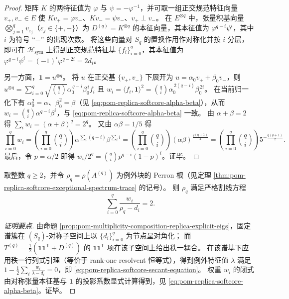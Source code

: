 \begin{proof}
矩阵 \(K\) 的两特征值为 \(\varphi\) 与 \(\psi=-\varphi^{-1}\)，并可取一组正交规范特征向量 \(v_+,v_-\in E\) 使
\(
Kv_+=\varphi v_+
\)、\(
Kv_-=\psi v_-
\)、\(
v_+\perp v_-
\)。
在 \(E^{\otimes q}\) 中，张量积基向量 \(\bigotimes_{j=1}^q v_{\varepsilon_j}\)（\(\varepsilon_j\in\{+,-\}\)）为 \(D^{(q)}=K^{\otimes q}\) 的本征向量，其本征值为 \(\varphi^{q-i}\psi^i\)，其中 \(i\) 为符号 “\(-\)” 的出现次数。
将这些向量对 \(S_q\) 的置换作用作对称化并按 \(i\) 分层，即可在 \(\mathcal H_{\mathrm{sym}}\) 上得到正交规范特征基 \(\{f_i\}_{i=0}^{q}\)，其本征值为 \(\varphi^{q-i}\psi^i=(-1)^i\varphi^{q-2i}=2d_i\)。
\par
另一方面，\(\mathbf{1}=u^{\otimes q}\)。
将 \(u\) 在正交基 \(\{v_+,v_-\}\) 下展开为 \(u=\alpha_0 v_+ +\beta_0 v_-\)，则
\(
u^{\otimes q}
=\sum_{i=0}^q \sqrt{\binom{q}{i}}\alpha_0^{\,q-i}\beta_0^{\,i} f_i
\)
且
\(
w_i=\langle f_i,\mathbf{1}\rangle^2=\binom{q}{i}\alpha_0^{\,2(q-i)}\beta_0^{\,2i}
\)。
在当前归一化下有
\(
\alpha_0^{2}=\alpha
\)、\(
\beta_0^{2}=\beta
\)（见 \eqref{eq:pom-replica-softcore-alpha-beta}），从而 \(w_i=\binom{q}{i}\alpha^{q-i}\beta^i\)，与 \eqref{eq:pom-replica-softcore-alpha-beta} 一致。
由 \(\alpha+\beta=2\) 得 \(\sum_i w_i=(\alpha+\beta)^q=2^q\)。
又由 \(\alpha\beta=1/5\) 得
\[
\prod_{i=0}^{q}w_i
=\left(\prod_{i=0}^{q}\binom{q}{i}\right)\alpha^{\sum_{i}(q-i)}\beta^{\sum_i i}
=\left(\prod_{i=0}^{q}\binom{q}{i}\right)(\alpha\beta)^{\frac{q(q+1)}{2}}
=\left(\prod_{i=0}^{q}\binom{q}{i}\right)5^{-\frac{q(q+1)}{2}}.
\]
最后，令 \(p=\alpha/2\) 即得 \(w_i/2^q=\binom{q}{i}p^{q-i}(1-p)^i\)。证毕。
\end{proof}

\begin{proposition}\label{prop:pom-replica-softcore-exceptional-secant-equation}
取整数 \(q\ge 2\)，并令 \(\rho_q=\rho(A^{(q)})\) 为例外块的 Perron 根（见定理 \ref{thm:pom-replica-softcore-exceptional-spectrum-trace} 的记号）。
则 \(\rho_q\) 满足严格割线方程
\begin{equation}\label{eq:pom-replica-softcore-secant-equation}
\boxed{\;
\sum_{i=0}^{q}\frac{w_i}{\rho_q-d_i}=2.}
\end{equation}
\end{proposition}
\begin{proof}[证明要点]
由命题 \ref{prop:pom-multiplicity-composition-replica-explicit-eigs}，固定谱簇在 \((S_q)\)-对称子空间上以 \(\{d_i\}_{i=0}^{q}\) 为节点呈对角化；
而 \(T^{(q)}=\frac12(\mathbf{1}\mathbf{1}^{\mathsf T}+D^{(q)})\) 的 \(\mathbf{1}\mathbf{1}^{\mathsf T}\) 项在该子空间上给出秩一耦合。
在该谱基下应用秩一行列式引理（等价于 rank-one resolvent 恒等式），得到例外特征值 \(\lambda\) 满足
\(
1-\frac12\sum_i \frac{w_i}{\lambda-d_i}=0
\)，即 \eqref{eq:pom-replica-softcore-secant-equation}。
权重 \(w_i\) 的闭式由对称张量本征基与 \(\mathbf{1}\) 的投影系数显式计算得到，见 \eqref{eq:pom-replica-softcore-alpha-beta}。证毕。
\end{proof}

